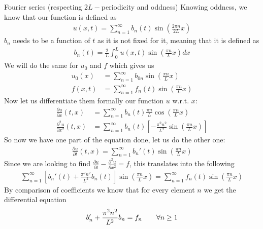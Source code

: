 \begin{parag}{Fourier series (respecting $2L-$periodicity and oddness)}
    Knowing oddness, we know that our function is defined as 
	\begin{align*} 
		u\left(x, t\right) =  \sum_{n = 1}^{\infty}b_n\left(t\right)\sin\left(\frac{2\pi n}{2L}x\right)
	\end{align*}
	$b_n$ needs to be a function of $t$ as it is not fixed for it, meaning that it is defined as 
	\begin{align*} 
		b_n\left(t\right) = \frac{2}{L}\int_{0}^{L} u\left(x, t\right)\sin\left(\frac{\pi n}{L}x\right)dx
	\end{align*}
	We will do the same for $u_0$ and $f$ which gives us 
	\begin{align*} 
		u_0\left(x\right) &=  \sum_{n = 1}^{\infty}b_{0 n}\sin\left(\frac{\pi n}{L}x\right)\\
		f\left(x, t\right) &=  \sum_{n = 1}^{\infty}f_n\left(t\right)\sin\left(\frac{\pi n}{L}x\right)
	\end{align*}
	Now let us differentiate them formally our function $u$ w.r.t. $x$:
	\begin{align*} 
		\frac{\partial u}{\partial x} \left(t, x\right) &=  \sum_{n = 1}^{\infty}b_n\left(t\right)\frac{\pi n}{L}\cos\left(\frac{\pi n}{L}x\right)\\
		\frac{\partial^2 u}{\partial x^2} \left(t, x\right) &= \sum_{n = 1}^{\infty}b_n\left(t\right)\left[-\frac{\pi^2n^2}{L^2}\sin\left(\frac{\pi n}{L}x\right)\right]
	\end{align*}
	So now we have one part of the equation done, let us do the other one:
	\begin{align*} 
		\frac{\partial u}{\partial t} \left(t, x\right)= \sum_{n = 1}^{\infty}b_n'\left(t\right)\sin\left(\frac{\pi n}{L}x\right)
	\end{align*}
	Since we are looking to find $\frac{\partial u}{\partial t} - \frac{\partial^2 u}{\partial x^2} = f$, this translates into the following 
	\begin{align*} 
		\sum_{n = 1}^{\infty}\left[b_n'\left(t\right) + \frac{\pi^2n^2}{L^2}b_n\left(t\right)\right]\sin\left(\frac{\pi n }{L}x\right) = \sum_{n = 1}^{\infty}f_n\left(t\right)\sin\left(\frac{\pi n}{L}x\right)
	\end{align*}
	By comparison of coefficients we know that for every element $n$ we get the differential equation 
	\begin{align*} 
		b_n' + \frac{\pi^2n^2}{L^2}b_n = f_n \mathspace \mathspace \forall n \geq 1

\end{align*}
\end{parag}
